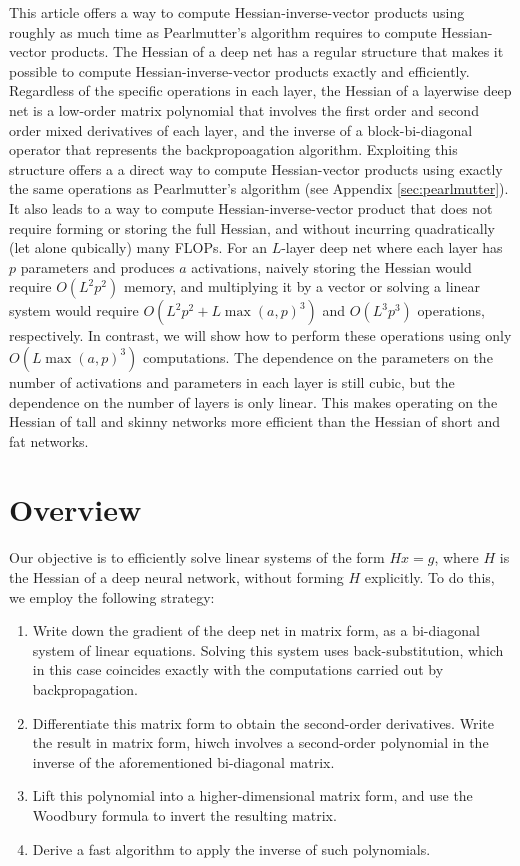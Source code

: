 \documentclass{article}
\begin{document}
This article offers a way to compute Hessian-inverse-vector products using roughly as much time as Pearlmutter's
algorithm requires to compute Hessian-vector products. The Hessian of a deep net has a regular structure that makes it
possible to compute Hessian-inverse-vector products exactly and efficiently. Regardless of the specific operations in
each layer, the Hessian of a layerwise deep net is a low-order matrix polynomial that involves the first order and
second order mixed derivatives of each layer, and the inverse of a block-bi-diagonal operator that represents the
backpropoagation algorithm. Exploiting this structure offers a a direct way to compute Hessian-vector products using
exactly the same operations as Pearlmutter's algorithm (see Appendix \ref{sec:pearlmutter}). It also leads to a way to
compute Hessian-inverse-vector product that does not require forming or storing the full Hessian, and without incurring
quadratically (let alone qubically) many FLOPs. For an $L$-layer deep net where each layer has $p$ parameters and
produces $a$ activations, naively storing the Hessian would require $O(L^2p^2)$ memory, and multiplying it by a vector
or solving a linear system would require $O(L^2p^2 + L\max(a,p)^3)$ and $O(L^3p^3)$ operations, respectively. In
contrast, we will show how to perform these operations using only $O(L \max(a, p)^3)$ computations. The dependence on
the parameters on the number of activations and parameters in each layer is still cubic, but the dependence on the
number of layers is only linear. This makes operating on the Hessian of tall and skinny networks more efficient than
the Hessian of short and fat networks.

\section{Overview}

Our objective is to efficiently solve linear systems of the form $H x = g$, where $H$ is the Hessian of a deep neural
network, without forming $H$ explicitly. To do this, we employ the following strategy:
\begin{enumerate}
  \item
    Write down the gradient of the deep net in matrix form, as a bi-diagonal system of linear
    equations. Solving this system uses back-substitution, which in this case
    coincides exactly with the computations carried out by backpropagation.
  \item
    Differentiate this matrix form to obtain the second-order derivatives. Write the result in matrix form,
    hiwch involves a second-order polynomial in the inverse of the aforementioned bi-diagonal matrix.
  \item
    Lift this polynomial into a higher-dimensional matrix form, and use the Woodbury formula to invert the resulting
    matrix.
  \item
    Derive a fast algorithm to apply the inverse of such polynomials.
\end{enumerate}
\end{document}
